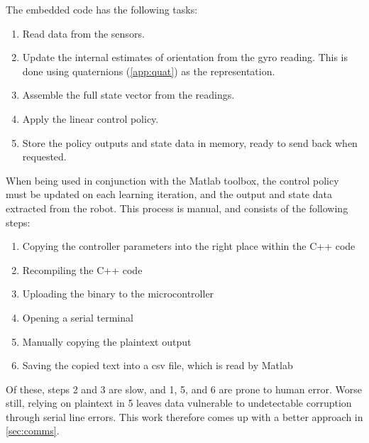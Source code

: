 \documentclass[main.tex]{subfiles}
\begin{document}
	The embedded code has the following tasks:
	\begin{enumerate}[noitemsep]
		\item Read data from the sensors.
		\item
			Update the internal estimates of orientation from the gyro reading.
			This is done using quaternions (\cref{app:quat}) as the representation.
		\item Assemble the full state vector from the readings.
		\item Apply the linear control policy.
		\item Store the policy outputs and state data in memory, ready to send back when requested.
	\end{enumerate}
	When being used in conjunction with the Matlab toolbox, the control policy must be updated on each learning iteration, and the output and state data extracted from the robot.
	This process is manual, and consists of the following steps:
	\begin{enumerate}[noitemsep]
		\item Copying the controller parameters into the right place within the C++ code
		\item Recompiling the C++ code
		\item Uploading the binary to the microcontroller
		\item Opening a serial terminal
		\item Manually copying the plaintext output
		\item Saving the copied text into a csv file, which is read by Matlab
	\end{enumerate}
	Of these, steps 2 and 3 are slow, and 1, 5, and 6 are prone to human error.
	Worse still, relying on plaintext in 5 leaves data vulnerable to undetectable corruption through serial line errors\footnotemark.
	This work therefore comes up with a better approach in \cref{sec:comms}.

\end{document}
